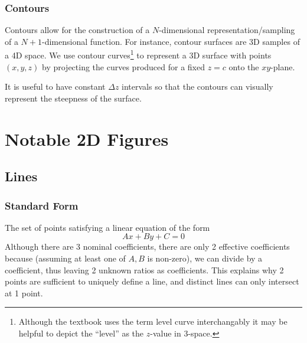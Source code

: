 \documentclass{article}
\begin{document}
\subsubsection{Contours}
Contours allow for the construction of a $N$-dimensional representation/sampling of a $N+1$-dimensional function. For instance, contour surfaces are 3D samples of a 4D space.
We use contour curves\footnote{Although the textbook uses the term level curve interchangably it may be helpful to depict the ``level'' as the $z$-value in 3-space.} to represent a 3D surface with points $(x,y,z)$ by projecting the curves produced for a fixed $z=c$ onto the $xy$-plane.

It is useful to have constant $\Delta z$ intervals so that the contours can visually represent the steepness of the surface.

\section{Notable 2D Figures}

\subsection{Lines}

\subsubsection{Standard Form} The set of points satisfying a linear equation of the form $$Ax + By + C = 0$$
Although there are 3 nominal coefficients, there are only 2 effective coefficients because (assuming at least one of $A,B$ is non-zero), we can divide by a coefficient, thus leaving 2 unknown ratios as coefficients. This explains why 2 points are sufficient to uniquely define a line, and distinct lines can only intersect at 1 point.
\end{document}
